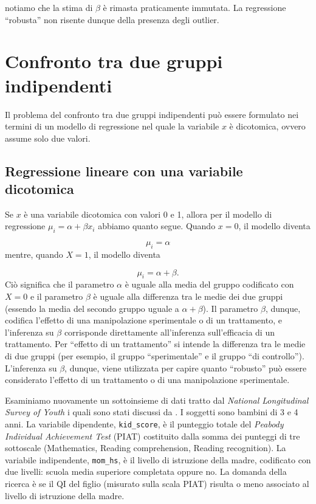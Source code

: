 \documentclass[
]{memoir}
\begin{document}
\noindent
notiamo che la stima di \(\beta\) è rimasta praticamente immutata. La regressione ``robusta'' non risente dunque della presenza degli outlier.

\hypertarget{confronto-tra-due-gruppi-indipendenti}{%
\chapter{Confronto tra due gruppi indipendenti}\label{confronto-tra-due-gruppi-indipendenti}}

Il problema del confronto tra due gruppi indipendenti può essere formulato nei termini di un modello di regressione nel quale la variabile \(x\) è dicotomica, ovvero assume solo due valori.

\hypertarget{regressione-lineare-con-una-variabile-dicotomica}{%
\section{Regressione lineare con una variabile dicotomica}\label{regressione-lineare-con-una-variabile-dicotomica}}

Se \(x\) è una variabile dicotomica con valori 0 e 1, allora per il modello di regressione \(\mu_i = \alpha + \beta x_i\) abbiamo quanto segue. Quando \(x=0\), il modello diventa

\[\mu_i = \alpha\]
\noindent
mentre, quando \(X=1\), il modello diventa

\[\mu_i = \alpha + \beta.\]
\noindent
Ciò significa che il parametro \(\alpha\) è uguale alla media del gruppo codificato con \(X=0\) e il parametro \(\beta\) è uguale alla differenza tra le medie dei due gruppi (essendo la media del secondo gruppo uguale a \(\alpha + \beta\)). Il parametro \(\beta\), dunque, codifica l'effetto di una manipolazione sperimentale o di un trattamento, e l'inferenza su \(\beta\) corrisponde direttamente all'inferenza sull'efficacia di un trattamento. Per ``effetto di un trattamento'' si intende la differenza tra le medie di due gruppi (per esempio, il gruppo ``sperimentale'' e il gruppo ``di controllo''). L'inferenza su \(\beta\), dunque, viene utilizzata per capire quanto ``robusto'' può essere considerato l'effetto di un trattamento o di una manipolazione sperimentale.

Esaminiamo nuovamente un sottoinsieme di dati tratto dal \emph{National Longitudinal Survey of Youth} i quali sono stati discussi da \citet{gelman2020regression}. I soggetti sono bambini di 3 e 4 anni. La variabile dipendente, \texttt{kid\_score}, è il punteggio totale del \emph{Peabody Individual Achievement Test} (PIAT) costituito dalla somma dei punteggi di tre sottoscale (Mathematics, Reading comprehension, Reading recognition). La variabile indipendente, \texttt{mom\_hs}, è il livello di istruzione della madre, codificato con due livelli: scuola media superiore completata oppure no. La domanda della ricerca è se il QI del figlio (misurato sulla scala PIAT) risulta o meno associato al livello di istruzione della madre.
\end{document}
